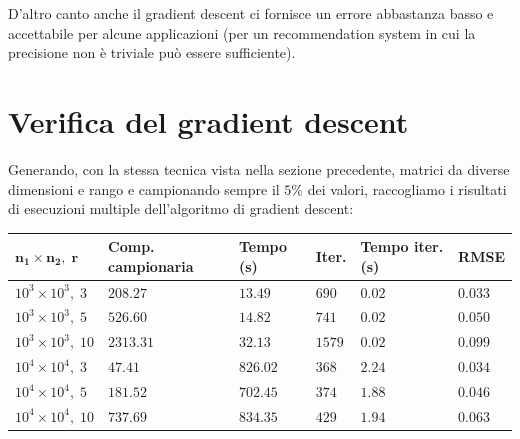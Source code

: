 \documentclass[12pt,a4paper]{report}
\begin{document}
D'altro canto anche il gradient descent ci 
fornisce un errore abbastanza basso e accettabile per alcune applicazioni
(per un recommendation system in cui la precisione
non è triviale può essere sufficiente).

\newpage

\section{Verifica del gradient descent}

Generando, con la stessa tecnica vista nella sezione precedente,
matrici da diverse dimensioni e rango
e campionando sempre il $5\%$ dei valori, raccogliamo i risultati
di esecuzioni multiple dell'algoritmo di gradient descent:
\begin{table}[H]
  \centering
  \begin{tabular}{@{}llllll@{}}
  \toprule
  \textbf{$\boldsymbol{n_1 \times n_2, \; r}$} & \textbf{Comp. campionaria} & \textbf{Tempo (s)} & \textbf{Iter.} & \textbf{Tempo iter. (s)} & \textbf{RMSE} \\ \midrule
  $10^3 \times 10^3, \; 3$  & $208.27$  & $13.49$   & $690$     & $0.02$     & $0.033$     \\ \midrule
  $10^3 \times 10^3, \; 5$  & $526.60$  & $14.82$   & $741$     & $0.02$     & $0.050$     \\ \midrule
  $10^3 \times 10^3, \; 10$ & $2313.31$ & $32.13$   & $1579$    & $0.02$     & $0.099$     \\ \midrule
  $10^4 \times 10^4, \; 3$  & $47.41$   & $826.02$  & $368$     & $2.24$     & $0.034$     \\ \midrule
  $10^4 \times 10^4, \; 5$  & $181.52$  & $702.45$  & $374$     & $1.88$     & $0.046$     \\ \midrule
  $10^4 \times 10^4, \; 10$ & $737.69$  & $834.35$  & $429$     & $1.94$     & $0.063$     \\ \bottomrule
  \end{tabular}
\end{table}
\end{document}
